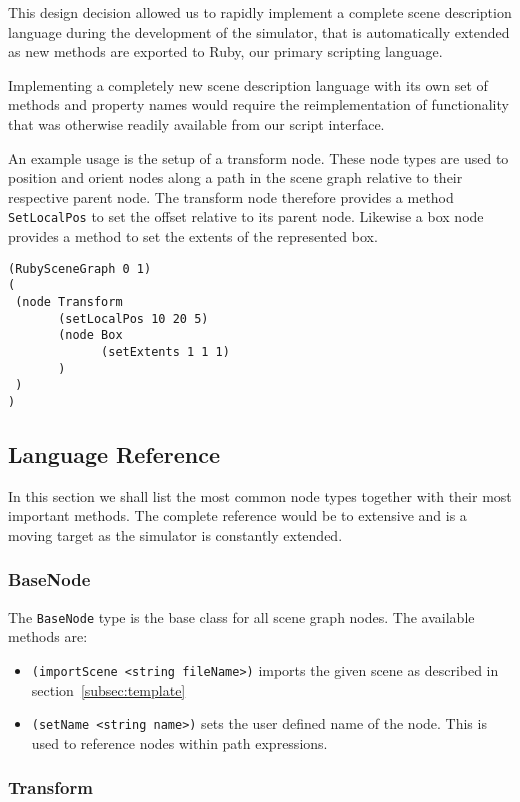 This design decision allowed us to rapidly implement a complete scene
description language during the development of the simulator, that is
automatically extended as new methods are exported to Ruby, our
primary scripting language. 

Implementing a completely new scene description language with its own
set of methods and property names would require the reimplementation
of functionality that was otherwise readily available from our script
interface.

An example usage is the setup of a transform node. These node types
are used to position and orient nodes along a path in the scene graph
relative to their respective parent node.  The transform node
therefore provides a method \texttt{SetLocalPos} to set the offset
relative to its parent node. Likewise a box node provides a method to
set the extents of the represented box.

\begin{lstlisting}[caption={Method call example}, label=rsg:method]
(RubySceneGraph 0 1)
(
 (node Transform 
       (setLocalPos 10 20 5)
       (node Box 
             (setExtents 1 1 1)
       )
 )
)
\end{lstlisting}

\subsection{Language Reference}

In this section we shall list the most common node types together with
their most important methods. The complete reference would be to
extensive and is a moving target as the simulator is constantly
extended.

\subsubsection{BaseNode}
The \texttt{BaseNode} type is the base class for all scene graph
nodes. The available methods are:

\begin{itemize}
\item \texttt{(importScene <string fileName>)} imports the given scene as
  described in section~\ref{subsec:template}
\item \texttt{(setName <string name>)} sets the user defined name of the
  node. This is used to reference nodes within path expressions.
\end{itemize}
\subsubsection{Transform}

